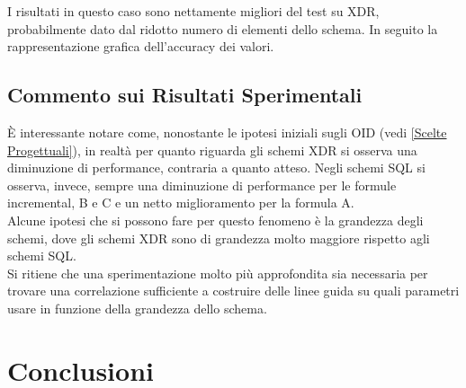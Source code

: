 \documentclass[a4paper,10pt]{article}
\begin{document}
I risultati in questo caso sono nettamente migliori del test su XDR, probabilmente dato dal ridotto numero di elementi dello schema.
In seguito la rappresentazione grafica dell'accuracy dei valori.

\begin{center}
\end{center}

\subsection{Commento sui Risultati Sperimentali}

È interessante notare come, nonostante le ipotesi iniziali sugli OID (vedi \ref{Scelte Progettuali}), in realtà per quanto riguarda gli schemi XDR si osserva una diminuzione di performance, contraria a quanto atteso. Negli schemi SQL si osserva, invece, sempre una diminuzione di performance per le formule incremental, B e C e un netto miglioramento per la formula A.\\

Alcune ipotesi che si possono fare per questo fenomeno è la grandezza degli schemi, dove gli schemi XDR sono di grandezza molto maggiore rispetto agli schemi SQL.\\

Si ritiene che una sperimentazione molto più approfondita sia necessaria per trovare una correlazione sufficiente a costruire delle linee guida su quali parametri usare in funzione della grandezza dello schema.

\section{Conclusioni}
\end{document}
